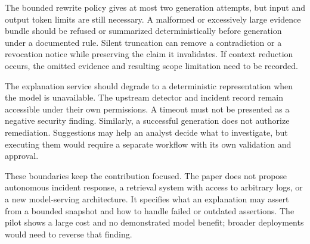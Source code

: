 The bounded rewrite policy gives at most two generation attempts, but input and output token limits are still necessary. A malformed or excessively large evidence bundle should be refused or summarized deterministically before generation under a documented rule. Silent truncation can remove a contradiction or a revocation notice while preserving the claim it invalidates. If context reduction occurs, the omitted evidence and resulting scope limitation need to be recorded.

The explanation service should degrade to a deterministic representation when the model is unavailable. The upstream detector and incident record remain accessible under their own permissions. A timeout must not be presented as a negative security finding. Similarly, a successful generation does not authorize remediation. Suggestions may help an analyst decide what to investigate, but executing them would require a separate workflow with its own validation and approval.

These boundaries keep the contribution focused. The paper does not propose autonomous incident response, a retrieval system with access to arbitrary logs, or a new model-serving architecture. It specifies what an explanation may assert from a bounded snapshot and how to handle failed or outdated assertions. The pilot shows a large cost and no demonstrated model benefit; broader deployments would need to reverse that finding.
